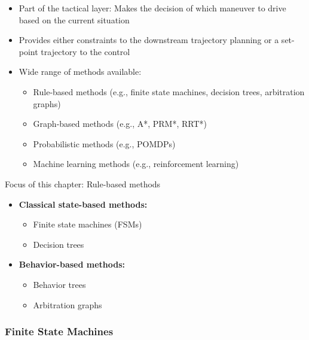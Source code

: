 \begin{itemize}
    \item Part of the tactical layer: Makes the decision of which maneuver to drive based on the current situation
    \item Provides either constraints to the downstream trajectory planning or a set-point trajectory to the control
    \item Wide range of methods available:
          \begin{itemize}
              \item Rule-based methods (e.g., finite state machines, decision trees, arbitration graphs)
              \item Graph-based methods (e.g., A*, PRM*, RRT*)
              \item Probabilistic methods (e.g., POMDPs)
              \item Machine learning methods (e.g., reinforcement learning)
          \end{itemize}
\end{itemize}

Focus of this chapter: Rule-based methods

\begin{itemize}
    \item \textbf{Classical state-based methods:}
          \begin{itemize}
              \item Finite state machines (FSMs)
              \item Decision trees
          \end{itemize}

    \item \textbf{Behavior-based methods:}
          \begin{itemize}
              \item Behavior trees
              \item Arbitration graphs
          \end{itemize}
\end{itemize}

\subsubsection*{Finite State Machines}

